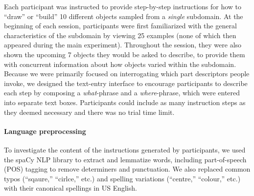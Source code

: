 \documentclass[10pt,letterpaper]{article}
\begin{document}
Each participant was instructed to provide step-by-step instructions for how to ``draw'' or ``build'' 10 different objects sampled from a \textit{single} subdomain.
At the beginning of each session, participants were first familiarized with the general characteristics of the subdomain by viewing 25 examples (none of which then appeared during the main experiment).
Throughout the session, they were also shown the upcoming 7 objects they would be asked to describe, to provide them with concurrent information about how objects varied within the subdomain.
Because we were primarily focused on interrogating which part descriptors people invoke, we designed the text-entry interface to encourage participants to describe each step by composing a \textit{what}-phrase and a \textit{where}-phrase, which were entered into separate text boxes. 
Participants could include as many instruction steps as they deemed necessary and there was no trial time limit.


\paragraph{Language preprocessing} %
To investigate the content of the instructions generated by participants, we used the spaCy NLP library to extract and lemmatize words, including part-of-speech (POS) tagging to remove determiners and punctuation. We also replaced common typos (``sqaure,'' ``cirlce,'' etc.) and spelling variations (``centre,'' ``colour,'' etc.) with their canonical spellings in US English.
\end{document}
